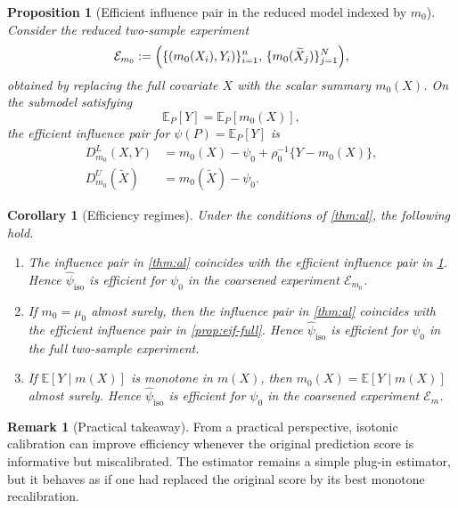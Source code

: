 \documentclass{article}
\theoremstyle{plain}
\newtheorem{proposition}{Proposition}
\newtheorem{corollary}{Corollary}
\theoremstyle{definition}
\newtheorem{remark}{Remark}
\newcommand{\E}{\mathbb{E}}
\newcommand{\1}{\mathbbm{1}}
\newcommand{\rhozero}{\rho_0}
\newcommand{\muzero}{\mu_0}
\begin{document}
\begin{proposition}[Efficient influence pair in the reduced model indexed by \(m_0\)]
\label{prop:eif-red}
Consider the reduced two-sample experiment
\[
\mathcal E_{m_0}
:=
\Bigl(
\{(m_0(X_i),Y_i)\}_{i=1}^n,\,
\{m_0(\widetilde X_j)\}_{j=1}^N
\Bigr),
\]
obtained by replacing the full covariate \(X\) with the scalar summary \(m_0(X)\). On the submodel satisfying
\[
\E_P[Y]=\E_P[m_0(X)],
\]
the efficient influence pair for \(\psi(P)=\E_P[Y]\) is
\begin{align}
\label{eq:eif-red-L}
D_{m_0}^L(X,Y)
&=
m_0(X)-\psi_0+\rhozero^{-1}\{Y-m_0(X)\},\\
\label{eq:eif-red-U}
D_{m_0}^U(\widetilde X)
&=
m_0(\widetilde X)-\psi_0.
\end{align}
\end{proposition}

\begin{corollary}[Efficiency regimes]
\label{cor:efficiency}
Under the conditions of \cref{thm:al}, the following hold.
\begin{enumerate}[leftmargin=6mm,label=(\roman*)]
\item The influence pair in \cref{thm:al} coincides with the efficient influence pair in \cref{prop:eif-red}. Hence \(\widehat{\psi}_{\mathrm{iso}}\) is efficient for \(\psi_0\) in the coarsened experiment \(\mathcal E_{m_0}\).
\item If \(m_0=\muzero\) almost surely, then the influence pair in \cref{thm:al} coincides with the efficient influence pair in \cref{prop:eif-full}. Hence \(\widehat{\psi}_{\mathrm{iso}}\) is efficient for \(\psi_0\) in the full two-sample experiment.
\item If \(\E[Y\mid m(X)]\) is monotone in \(m(X)\), then \(m_0(X)=\E[Y\mid m(X)]\) almost surely. Hence \(\widehat{\psi}_{\mathrm{iso}}\) is efficient for \(\psi_0\) in the coarsened experiment \(\mathcal E_m\).
\end{enumerate}
\end{corollary}



\begin{remark}[Practical takeaway]
From a practical perspective, isotonic calibration can improve efficiency whenever the original prediction score is informative but miscalibrated. The estimator remains a simple plug-in estimator, but it behaves as if one had replaced the original score by its best monotone recalibration.
\end{remark}
\end{document}
